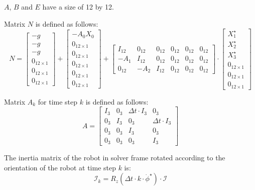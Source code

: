 \documentclass[a4paper,11pt]{article}
\begin{document}
$A$, $B$ and $E$ have a size of 12 by 12.

Matrix $N$ is defined as follows:
\begin{equation}
N = \begin{bmatrix} -g \\ -g \\ -g \\ 0_{12 \times 1} \\ 0_{12 \times 1} \\ 0_{12 \times 1} \end{bmatrix} + \begin{bmatrix} -A_0 X_0 \\ 0_{12 \times 1} \\ 0_{12 \times 1} \\ 0_{12 \times 1} \\ 0_{12 \times 1} \\ 0_{12 \times 1}  \end{bmatrix} + \begin{bmatrix} I_{12} & 0_{12} & 0_{12} & 0_{12} & 0_{12} & 0_{12}\\ -A_1 & I_{12} & 0_{12} & 0_{12} & 0_{12} & 0_{12} \\ 0_{12} & -A_2 & I_{12} & 0_{12} & 0_{12} & 0_{12}\end{bmatrix} \cdot \begin{bmatrix} X_1^\star \\ X_2^\star \\ X_3^\star \\ 0_{12 \times 1} \\ 0_{12 \times 1} \\ 0_{12 \times 1}  \end{bmatrix} 
\end{equation}

Matrix $A_k$ for time step $k$ is defined as follows:
\begin{equation}
A = \begin{bmatrix} 
I_3 & 0_3 & \Delta t \cdot I_3 & 0_3 \\
0_3 & I_3 & 0_3 & \Delta t \cdot I_3 \\
0_3 & 0_3 & I_3 & 0_3 \\
0_3 & 0_3 & 0_3 & I_3
\end{bmatrix}
\end{equation}


The inertia matrix of the robot in solver frame rotated according to the orientation of the robot at time step $k$ is:
\begin{equation}
\mathcal{I}_k = R_z(\Delta t \cdot k \cdot \dot \phi^\star) \cdot \mathcal{I}
\end{equation}
\end{document}
